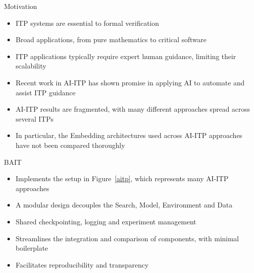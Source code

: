 \documentclass[final]{beamer}
\newlength{\onecolwid}
\begin{document}
\begin{frame}[t]
\begin{columns}[t]
\begin{column}{\onecolwid}
                \begin{block}{Motivation}
                    \begin{itemize}
                        \item ITP systems are essential to formal verification
                        \item Broad applications, from pure mathematics to critical software
                        \item ITP applications typically require expert human guidance, limiting their scalability
                        \item Recent work in AI-ITP has shown promise in applying AI to automate and assist ITP guidance
                        \item AI-ITP results are fragmented, with many different approaches spread across several ITPs
                        \item In particular, the Embedding architectures used across AI-ITP approaches have not been compared thoroughly
                    \end{itemize}

                \end{block}

                \begin{block}{BAIT}

                    \begin{itemize}
                        \item Implements the setup in Figure~\ref{aitp},
                        which represents many AI-ITP approaches
                        \item A modular design decouples the
                        Search, Model, Environment and Data
                        \item Shared checkpointing, logging and experiment management
                        \item Streamlines the integration and comparison of
                        components, with minimal boilerplate
                        \item Facilitates reproducibility and transparency
                    \end{itemize}

                \end{block}






\end{column}
\end{columns}
\end{frame}
\end{document}
